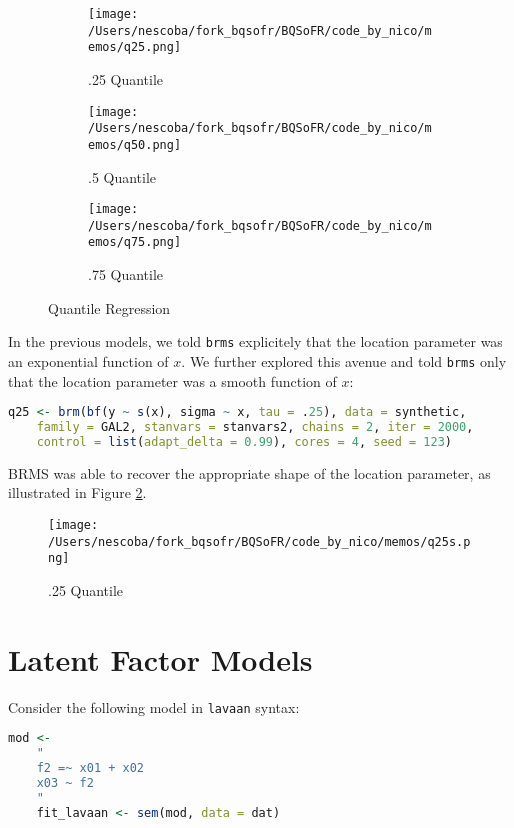 \documentclass{article}
\begin{document}
\begin{figure}[ht]
    \centering
    \begin{subfigure}[b]{0.3\textwidth}
        \centering
        \texttt{[image: /Users/nescoba/fork\_bqsofr/BQSoFR/code\_by\_nico/memos/q25.png]}
        \caption{.25 Quantile}
    \end{subfigure}
    \hfill
    \begin{subfigure}[b]{0.3\textwidth}
        \centering
        \texttt{[image: /Users/nescoba/fork\_bqsofr/BQSoFR/code\_by\_nico/memos/q50.png]}
        \caption{.5 Quantile}
    \end{subfigure}
    \hfill
    \begin{subfigure}[b]{0.3\textwidth}
        \centering
        \texttt{[image: /Users/nescoba/fork\_bqsofr/BQSoFR/code\_by\_nico/memos/q75.png]}
        \caption{.75 Quantile}
    \end{subfigure}
    \caption{Quantile Regression}
    \label{fig:q}
\end{figure}

In the previous models, we told \texttt{brms} explicitely that the location parameter
was an exponential function of $x$. We further explored this avenue and told \texttt{brms} 
only that the location parameter was a smooth function of $x$:

\begin{lstlisting}[language=R]
    q25 <- brm(bf(y ~ s(x), sigma ~ x, tau = .25), data = synthetic, 
    family = GAL2, stanvars = stanvars2, chains = 2, iter = 2000, 
    control = list(adapt_delta = 0.99), cores = 4, seed = 123)
\end{lstlisting}

BRMS was able to recover the appropriate shape of the location parameter, as illustrated in Figure \ref{fig:q25}.

\begin{figure}[ht]
    \centering
    \texttt{[image: /Users/nescoba/fork\_bqsofr/BQSoFR/code\_by\_nico/memos/q25s.png]}
    \caption{.25 Quantile}
    \label{fig:q25}
\end{figure}

\section{Latent Factor Models}

Consider the following model in \texttt{lavaan} syntax:

\begin{lstlisting}[language=R]
    mod <- 
    "
    f2 =~ x01 + x02
    x03 ~ f2
    "
    fit_lavaan <- sem(mod, data = dat)
\end{lstlisting}
\end{document}
